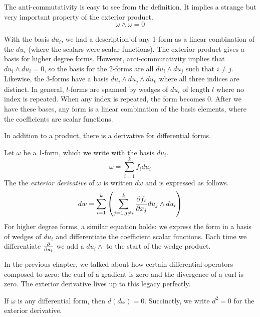 \documentclass[fleqn,letterpaper]{report}
\begin{document}
The anti-commutativity is easy to see from the definition. 
It implies a strange but very important property of the
exterior product.
\begin{equation*}
\omega \wedge \omega = 0
\end{equation*}

With the basis $du_i$, we had a description of any 1-form as a
linear combination of the $du_i$ (where the scalars were
scalar functions). The exterior product gives a
basis for higher degree forms. However, anti-commutativity
implies that $du_i \wedge du_i = 0$, so the
basis for the 2-forms are all $du_i \wedge du_j$ such that $i
\neq j$. Likewise, the 3-forms have a basis $du_i \wedge du_j
\wedge du_k$ where all three indices are distinct. In
general, $l$-forms are spanned by wedges of $du_i$ of length
$l$ where no index is repeated. When any index is repeated,
the form becomes 0. After we have these bases, any form is a
linear combination of the basis elements, where the
coefficients are scalar functions. 

In addition to a product, there is a derivative for
differential forms. 

\begin{defn}
Let $\omega$ be a 1-form, which we write with the basis
$du_i$.
\begin{equation*}
\omega = \sum_{i=1}^k f_i du_i 
\end{equation*}
The the \emph{exterior derivative} of $\omega$ is written
$d\omega$ and is expressed as follows.
\begin{equation*}
dw = \sum_{i=1}^k \left( \sum_{j=1, j \neq i}^k \frac{\partial
f_i}{\partial x_j} du_j \wedge du_i \right) 
\end{equation*}
For higher degree forms, a similar equation holds: we express
the form in a basis of wedges of $du_i$ and differentiate the
coefficient scalar functions. Each time we differentiate
$\frac{\partial}{\partial u_i}$ we add a $du_i \wedge$ to the start of
the wedge product. 
\end{defn}

In the previous chapter, we talked about how certain
differential operators composed to zero: the curl of a
gradient is zero and the divergence of a curl is zero. The
exterior derivative lives up to this legacy perfectly.

\begin{prop}
If $\omega$ is any differential form, then $d(d\omega) = 0$.
Succinctly, we write $d^2 = 0$ for the exterior derivative.
\end{prop}
\end{document}
